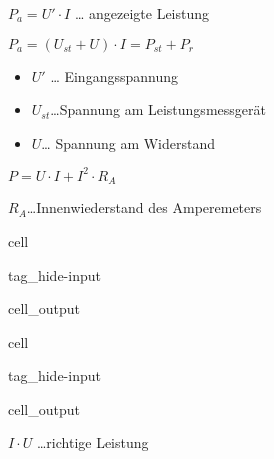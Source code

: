 \documentclass[letterpaper,10pt,english]{jupyterBook}
\begin{document}
\sphinxAtStartPar
\(P_a = U'\cdot I\) … angezeigte Leistung

\sphinxAtStartPar
\(P_a = (U_{st} + U)\cdot I = P_{st} + P_r\)
\begin{itemize}
\item {} 
\sphinxAtStartPar
\(U'\) … Eingangsspannung

\item {} 
\sphinxAtStartPar
\(U_{st}\)…Spannung am Leistungsmessgerät

\item {} 
\sphinxAtStartPar
\(U\)… Spannung am Widerstand

\end{itemize}

\sphinxAtStartPar
\(P = U\cdot I + I^2\cdot R_A\)

\sphinxAtStartPar
\(R_A\)…Innenwiederstand des Amperemeters

\begin{DUlineblock}{0em}
\item[] 
\end{DUlineblock}

\begin{sphinxuseclass}{cell}
\begin{sphinxuseclass}{tag_hide-input}\begin{sphinxVerbatimOutput}

\begin{sphinxuseclass}{cell_output}
\noindent{}

\end{sphinxuseclass}\end{sphinxVerbatimOutput}

\end{sphinxuseclass}
\end{sphinxuseclass}
\begin{sphinxuseclass}{cell}
\begin{sphinxuseclass}{tag_hide-input}\begin{sphinxVerbatimOutput}

\begin{sphinxuseclass}{cell_output}
\noindent{}

\end{sphinxuseclass}\end{sphinxVerbatimOutput}

\end{sphinxuseclass}
\end{sphinxuseclass}
\sphinxAtStartPar
\(I\cdot U\)  …richtige Leistung
\end{document}
